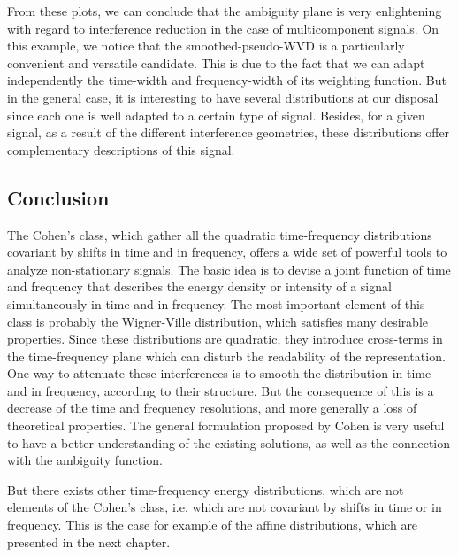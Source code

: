 From these plots, we can conclude that the ambiguity plane is very
enlightening with regard to interference reduction in the case of
multicomponent signals. On this example, we notice that the
smoothed-pseudo-WVD is a particularly convenient and versatile
candidate. This is due to the fact that we can adapt independently the
time-width and frequency-width of its weighting function. But in the
general case, it is interesting to have several distributions at our
disposal since each one is well adapted to a certain type of
signal. Besides, for a given signal, as a result of the different
interference geometries, these distributions offer complementary
descriptions of this signal.


\subsection{Conclusion}
  The Cohen's class, which gather all the quadratic time-frequency
distributions covariant by shifts in time and in frequency, offers a wide
set of powerful tools to analyze non-stationary signals. The basic idea is
to devise a joint function of time and frequency that describes the energy
density or intensity of a signal simultaneously in time and in
frequency. The most important element of this class is probably the
Wigner-Ville distribution, which satisfies many desirable properties. Since
these distributions are quadratic, they introduce cross-terms in the
time-frequency plane which can disturb the readability of the
representation. One way to attenuate these interferences is to smooth the
distribution in time and in frequency, according to their structure. But
the consequence of this is a decrease of the time and frequency
resolutions, and more generally a loss of theoretical properties. The
general formulation proposed by Cohen is very useful to have a better
understanding of the existing solutions, as well as the connection with the
ambiguity function.

But there exists other time-frequency energy distributions, which are not
elements of the Cohen's class, i.e. which are not covariant by shifts in
time or in frequency. This is the case for example of the affine
distributions, which are presented in the next chapter.
